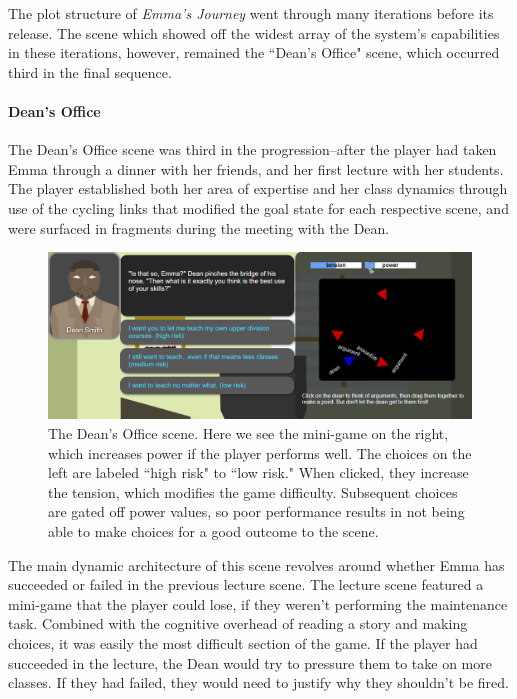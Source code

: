 The plot structure of \textit{Emma's Journey} went through many iterations before its release. The scene which showed off the widest array of the system's capabilities in these iterations, however, remained the ``Dean's Office" scene, which occurred third in the final sequence.

\paragraph{Dean's Office}

The Dean's Office scene was third in the progression--after the player had taken Emma through a dinner with her friends, and her first lecture with her students. The player established both her area of expertise and her class dynamics through use of the cycling links that modified the goal state for each respective scene, and were surfaced in fragments during the meeting with the Dean.


\begin{figure}
    \centering
    \includegraphics[width=\textwidth]{figures/3-StoryAssembler/dean-level.png}
    \caption{The Dean's Office scene. Here we see the mini-game on the right, which increases power if the player performs well. The choices on the left are labeled ``high risk" to ``low risk." When clicked, they increase the tension, which modifies the game difficulty. Subsequent choices are gated off power values, so poor performance results in not being able to make choices for a good outcome to the scene.}
    \label{fig:deans_office}
\end{figure}


The main dynamic architecture of this scene revolves around whether Emma has succeeded or failed in the previous lecture scene. The lecture scene featured a mini-game that the player could lose, if they weren't performing the maintenance task. Combined with the cognitive overhead of reading a story and making choices, it was easily the most difficult section of the game. If the player had succeeded in the lecture, the Dean would try to pressure them to take on more classes. If they had failed, they would need to justify why they shouldn't be fired.

